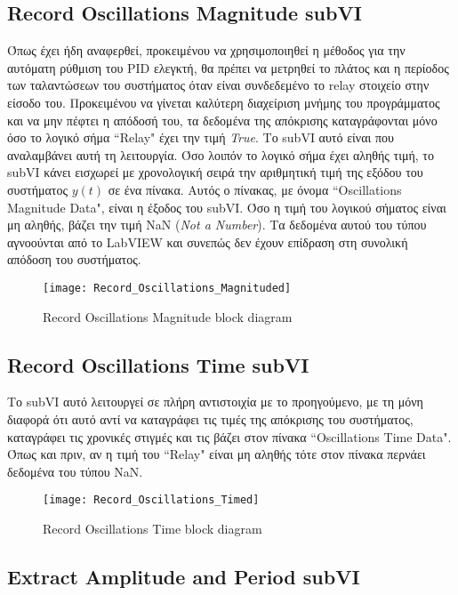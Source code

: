 \subsection{Record Oscillations Magnitude subVI}

Όπως έχει ήδη αναφερθεί, προκειμένου να χρησιμοποιηθεί η μέθοδος για την αυτόματη ρύθμιση του PID ελεγκτή, θα πρέπει να μετρηθεί το πλάτος και η περίοδος των ταλαντώσεων του συστήματος όταν είναι συνδεδεμένο το relay στοιχείο στην είσοδο του. Προκειμένου να γίνεται καλύτερη διαχείριση μνήμης του προγράμματος και να μην πέφτει η απόδοσή του, τα δεδομένα της απόκρισης καταγράφονται μόνο όσο το λογικό σήμα ``Relay" έχει την τιμή \textit{True}. Το subVI αυτό είναι που αναλαμβάνει αυτή τη λειτουργία. Όσο λοιπόν το λογικό σήμα έχει αληθής τιμή, το subVI κάνει εισχωρεί με χρονολογική σειρά την αριθμητική τιμή της εξόδου του συστήματος $y(t)$ σε ένα πίνακα. Αυτός ο πίνακας, με όνομα ``Oscillations Magnitude Data", είναι η έξοδος του subVI. Όσο η τιμή του λογικού σήματος είναι μη αληθής, βάζει την τιμή NaN (\emph{Not a Number}). Τα δεδομένα αυτού του τύπου αγνοούνται από το LabVIEW και συνεπώς δεν έχουν επίδραση στη συνολική απόδοση του συστήματος.

\begin{figure}[h]
  \centering
  \texttt{[image: Record\_Oscillations\_Magnituded]}
  \caption{Record Oscillations Magnitude block diagram}
  \label{fig:Record_Oscillations_Magnituded}
\end{figure}

\subsection{Record Oscillations Time subVI}

Το subVI αυτό λειτουργεί σε πλήρη αντιστοιχία με το προηγούμενο, με τη μόνη διαφορά ότι αυτό αντί να καταγράφει τις τιμές της απόκρισης του συστήματος, καταγράφει τις χρονικές στιγμές και τις βάζει στον πίνακα ``Oscillations Time Data". Όπως και πριν, αν η τιμή του ``Relay" είναι μη αληθής τότε στον πίνακα περνάει δεδομένα του τύπου NaN.

\begin{figure}[h]
  \centering
  \texttt{[image: Record\_Oscillations\_Timed]}
  \caption{Record Oscillations Time block diagram}
  \label{fig:Record_Oscillations_Timed}
\end{figure}

\subsection{Extract Amplitude and Period subVI}

